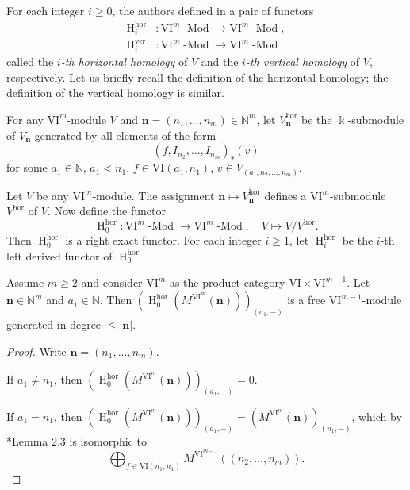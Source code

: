 \documentclass{amsart}
\numberwithin{equation}{section}
\DeclareMathOperator{\Mod}{-Mod}
\DeclareMathOperator{\HH}{H}
\newcommand{\N}{{\mathbb{N}}}
\newcommand{\hor}{{\mathrm{hor}}}
\newcommand{\ver}{{\mathrm{ver}}}
\newcommand{\VI}{{\mathrm{VI}}}
\begin{document}
For each integer $i\geqslant 0$, the authors defined in \cite{gta} a pair of functors 
\begin{align*} 
   \HH^\hor_i &: \VI^m\Mod \to \VI^m\Mod,\\
   \HH^\ver_i &: \VI^m\Mod \to \VI^m\Mod
\end{align*}
called the \emph{$i$-th horizontal homology} of $V$ and the \emph{$i$-th vertical homology} of $V$, respectively.
Let us briefly recall the definition of the horizontal homology; the definition of the vertical homology is similar. 

\begin{notation} \label{horizontal submodule}
   For any $\VI^m$-module $V$ and $\mathbf{n}=(n_1, \ldots, n_m)\in \N^m$, let $V^\hor_{\mathbf{n}}$ be the $\Bbbk$-submodule of $V_{\mathbf{n}}$ generated by all elements of the form 
   \[ (f, I_{n_2}, \ldots, I_{n_m})_*(v) \]
   for some $a_1\in \N$, $a_1<n_1$, $f\in \VI(a_1, n_1)$, $v\in V_{(a_1, n_2, \ldots, n_m)}$.
\end{notation}

Let $V$ be any $\VI^m$-module. The assignment $\mathbf{n} \mapsto V^\hor_{\mathbf{n}}$ defines a $\VI^m$-submodule $V^\hor$ of $V$. Now define the functor
\[ \HH^\hor_0 : \VI^m\Mod \to \VI^m\Mod, \quad V\mapsto V/V^\hor. \] 
Then $\HH^\hor_0$ is a right exact functor. For each integer $i\geqslant 1$, let $\HH^\hor_i$ be the $i$-th left derived functor of $\HH^\hor_0$. 

\begin{lemma} \label{lem: hor prin proj res}
   Assume $m\geqslant 2$ and consider $\VI^m$ as the product category $\VI\times \VI^{m-1}$. Let $\mathbf{n}\in \N^m$ and $a_1\in \N$. 
   Then $(\HH^\hor_0(M^{\VI^m}(\mathbf{n})))_{(a_1, -)}$ is a free $\VI^{m-1}$-module generated in degree $\leqslant |\mathbf{n}|$. 
\end{lemma}

\begin{proof}
   Write $\mathbf{n}=(n_1, \ldots, n_m)$. 
   
   If $a_1\neq n_1$, then $(\HH^\hor_0(M^{\VI^m}(\mathbf{n})))_{(a_1, -)} = 0$.

   If $a_1=n_1$, then $(\HH^\hor_0(M^{\VI^m}(\mathbf{n})))_{(a_1, -)} = (M^{\VI^m}(\mathbf{n}))_{(n_1, -)}$, which by \cite{gta}*{Lemma 2.3} is isomorphic to 
   \[ \bigoplus_{f\in \VI(n_1, n_1)} M^{\VI^{m-1}}((n_2, \ldots, n_m)). \]
\end{proof}
\end{document}
